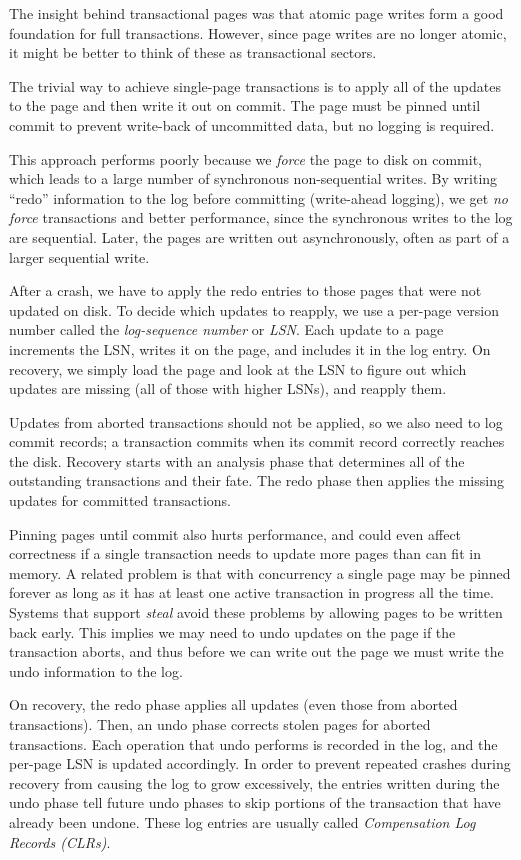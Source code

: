 \documentclass[letterpaper,twocolumn,10pt]{article}
\begin{document}
The insight behind transactional pages was
that atomic page writes form a good foundation for full transactions.
However, since page writes are no longer atomic, it might be
better to think of these as transactional sectors.

The trivial way to achieve single-page transactions is to apply all of
the updates to the page and then write it out on commit.  The page
must be pinned until commit to prevent write-back of uncommitted data,
but no logging is required.

This approach performs poorly because we {\em force} the page to disk
on commit, which leads to a large number of synchronous non-sequential
writes.  By writing ``redo'' information to the log before committing
(write-ahead logging), we get {\em no force} transactions and better
performance, since the synchronous writes to the log are sequential.
Later, the pages are written out asynchronously, often
as part of a larger sequential write.

After a crash, we have to apply the redo entries to those pages that
were not updated on disk.  To decide which updates to reapply, we use
a per-page version number called the {\em log-sequence number} or
{\em LSN}. Each update to a page increments the LSN, writes it on the
page, and includes it in the log entry.  On recovery, we simply
load the page and look at the LSN to figure out which updates are missing
(all of those with higher LSNs), and reapply them.

Updates from aborted transactions should not be applied, so we also
need to log commit records; a transaction commits when its commit
record correctly reaches the disk. Recovery starts with an analysis
phase that determines all of the outstanding transactions and their
fate.  The redo phase then applies the missing updates for committed
transactions.

Pinning pages until commit also hurts performance, and could even
affect correctness if a single transaction needs to update more pages
than can fit in memory. A related problem is that with concurrency a
single page may be pinned forever as long as it has at least one
active transaction in progress all the time.  Systems that support
{\em steal} avoid these problems by allowing pages to be written back
early.  This implies we may need to undo updates on the page if the
transaction aborts, and thus before we can write out the page we must
write the undo information to the log. 

On recovery, the redo phase applies all updates (even those from
aborted transactions).  Then, an undo phase corrects stolen pages for
aborted transactions.  Each operation that undo performs is recorded
in the log, and the per-page LSN is updated accordingly.  In order to
prevent repeated crashes during recovery from causing the log to grow
excessively, the entries written during the undo phase tell future
undo phases to skip portions of the transaction that have already been
undone.  These log entries are usually called {\em Compensation Log
Records (CLRs)}.
\end{document}
